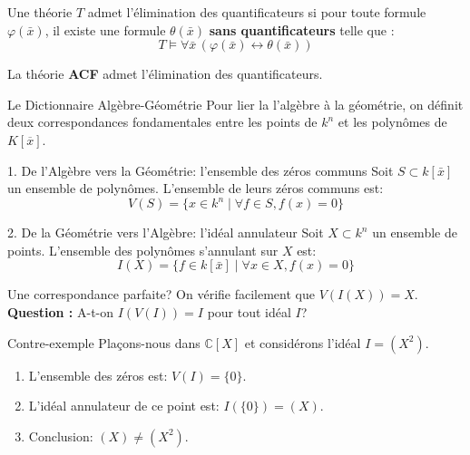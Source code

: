 \documentclass{beamer}
\begin{document}
  \begin{frame}
\begin{definition}
        Une théorie $T$ admet l'élimination des quantificateurs si pour toute formule $\varphi(\bar{x})$, il existe une formule $\theta(\bar{x})$ \textbf{sans quantificateurs} telle que :
        \[ T \models \forall \bar{x} \, (\varphi(\bar{x}) \leftrightarrow \theta(\bar{x})) \]
    \end{definition}
  \end{frame}

  \pause 
  \begin{theorem}[Tarski, 1951]
        La théorie \textbf{ACF} admet l'élimination des quantificateurs.
    \end{theorem}

  \begin{frame}{Le Dictionnaire Algèbre-Géométrie}
    Pour lier la l'algèbre à la géométrie, on définit deux correspondances fondamentales entre les points de $k^n$ et les polynômes de $K[\overline{x}]$.

    \pause
    \begin{block}{1. De l'Algèbre vers la Géométrie: l'ensemble des zéros communs}
        Soit $S \subset k[\bar{x}]$ un ensemble de polynômes. L'ensemble de leurs zéros communs est:
        \[ V(S) = \{ x \in k^n \mid \forall f \in S, f(x) = 0 \} \]
        
    \end{block}
    \pause
    \begin{block}{2. De la Géométrie vers l'Algèbre: l'idéal annulateur}
        Soit $X \subset k^n$ un ensemble de points. L'ensemble des polynômes s'annulant sur $X$ est:
        \[ I(X) = \{ f \in k[\bar{x}] \mid \forall x \in X, f(x) = 0 \} \]
    \end{block}
\end{frame}

% 
\begin{frame}{Une correspondance parfaite?}
    On vérifie facilement que $V(I(X)) = X$. \\
    \vspace{0.5cm}
    \textbf{Question :} A-t-on $I(V(I)) = I$ pour tout idéal $I$?

    \pause
    \begin{alertblock}{Contre-exemple}
        Plaçons-nous dans $\mathbb{C}[X]$ et considérons l'idéal $I = (X^2)$.
        \pause
        \begin{enumerate}
            \item L'ensemble des zéros est: $V(I) = \{ 0 \}$. \pause
            \item L'idéal annulateur de ce point est: $I(\{0\}) = (X)$. \pause
            \item Conclusion: $(X) \neq (X^2)$.
        \end{enumerate}
    \end{alertblock}
\end{frame}
\end{document}
